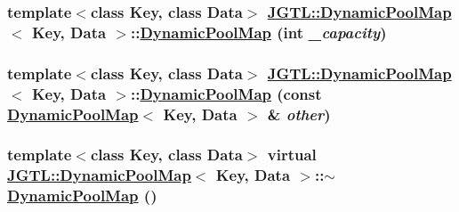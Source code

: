 \hypertarget{class_j_g_t_l_1_1_dynamic_pool_map_9735fb05911155de59c894f5074d7c34}{
\subsubsection[DynamicPoolMap]{\setlength{\rightskip}{0pt plus 5cm}template$<$class Key, class Data$>$ \hyperlink{class_j_g_t_l_1_1_dynamic_pool_map}{JGTL::Dynamic\-Pool\-Map}$<$ Key, Data $>$::\hyperlink{class_j_g_t_l_1_1_dynamic_pool_map}{Dynamic\-Pool\-Map} (int {\em \_\-capacity})}}
\label{class_j_g_t_l_1_1_dynamic_pool_map_9735fb05911155de59c894f5074d7c34}


\hypertarget{class_j_g_t_l_1_1_dynamic_pool_map_309ac93775245116f166ac406fc192bd}{
\subsubsection[DynamicPoolMap]{\setlength{\rightskip}{0pt plus 5cm}template$<$class Key, class Data$>$ \hyperlink{class_j_g_t_l_1_1_dynamic_pool_map}{JGTL::Dynamic\-Pool\-Map}$<$ Key, Data $>$::\hyperlink{class_j_g_t_l_1_1_dynamic_pool_map}{Dynamic\-Pool\-Map} (const \hyperlink{class_j_g_t_l_1_1_dynamic_pool_map}{Dynamic\-Pool\-Map}$<$ Key, Data $>$ \& {\em other})}}
\label{class_j_g_t_l_1_1_dynamic_pool_map_309ac93775245116f166ac406fc192bd}


\hypertarget{class_j_g_t_l_1_1_dynamic_pool_map_b833361ff8ae724639fb0d4ed9e6392f}{
\subsubsection[$\sim$DynamicPoolMap]{\setlength{\rightskip}{0pt plus 5cm}template$<$class Key, class Data$>$ virtual \hyperlink{class_j_g_t_l_1_1_dynamic_pool_map}{JGTL::Dynamic\-Pool\-Map}$<$ Key, Data $>$::$\sim$\hyperlink{class_j_g_t_l_1_1_dynamic_pool_map}{Dynamic\-Pool\-Map} ()}}
\label{class_j_g_t_l_1_1_dynamic_pool_map_b833361ff8ae724639fb0d4ed9e6392f}


